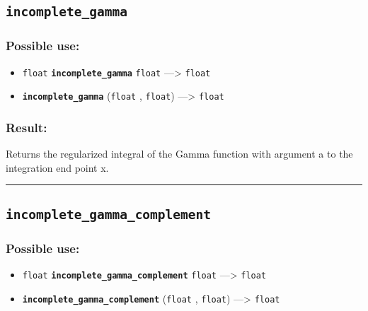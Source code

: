\documentclass[]{book}
\providecommand{\tightlist}{%
  \setlength{\itemsep}{0pt}\setlength{\parskip}{0pt}}
\theoremstyle{definition}
\theoremstyle{definition}
\theoremstyle{definition}
\theoremstyle{remark}
\begin{document}
\subsection{\texorpdfstring{\texttt{incomplete\_gamma}}{incomplete\_gamma}}\label{incomplete_gamma}

\subsubsection{Possible use:}\label{possible-use-270}

\begin{itemize}
\tightlist
\item
  \texttt{float} \textbf{\texttt{incomplete\_gamma}} \texttt{float}
  ---\textgreater{} \texttt{float}
\item
  \textbf{\texttt{incomplete\_gamma}} (\texttt{float} , \texttt{float})
  ---\textgreater{} \texttt{float}
\end{itemize}

\subsubsection{Result:}\label{result-260}

Returns the regularized integral of the Gamma function with argument a
to the integration end point x.

\begin{center}\rule{0.5\linewidth}{\linethickness}\end{center}

\subsection{\texorpdfstring{\texttt{incomplete\_gamma\_complement}}{incomplete\_gamma\_complement}}\label{incomplete_gamma_complement}

\subsubsection{Possible use:}\label{possible-use-271}

\begin{itemize}
\tightlist
\item
  \texttt{float} \textbf{\texttt{incomplete\_gamma\_complement}}
  \texttt{float} ---\textgreater{} \texttt{float}
\item
  \textbf{\texttt{incomplete\_gamma\_complement}} (\texttt{float} ,
  \texttt{float}) ---\textgreater{} \texttt{float}
\end{itemize}
\end{document}
